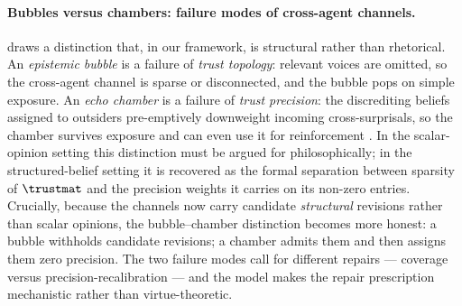 \paragraph{Bubbles versus chambers: failure modes of cross-agent channels.}
\citet{nguyen2020EchoChambers} draws a distinction that, in our
framework, is structural rather than rhetorical. An
\emph{epistemic bubble} is a failure of \emph{trust topology}:
relevant voices are omitted, so the cross-agent channel is sparse or
disconnected, and the bubble pops on simple exposure. An
\emph{echo chamber} is a failure of \emph{trust precision}: the
discrediting beliefs assigned to outsiders pre-emptively downweight
incoming cross-surprisals, so the chamber survives exposure and can
even use it for reinforcement
\citep{Pollock2024_3, Turner2023_2, Clinkenbeard2025_4}. In the
scalar-opinion setting this distinction must be argued for
philosophically; in the structured-belief setting it is recovered as
the formal separation between sparsity of $\trustmat$ and the
precision weights it carries on its non-zero entries. Crucially,
because the channels now carry candidate \emph{structural} revisions
rather than scalar opinions, the bubble--chamber distinction becomes
more honest: a bubble withholds candidate revisions; a chamber
admits them and then assigns them zero precision. The two failure
modes call for different repairs --- coverage versus
precision-recalibration --- and the model makes the repair
prescription mechanistic rather than virtue-theoretic.
